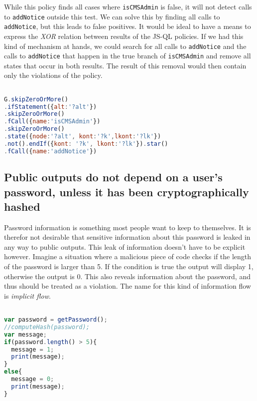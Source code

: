 While this policy finds all cases where \texttt{isCMSAdmin} is false, it will not detect calls to \texttt{addNotice} outside this test. We can solve this by finding all calls to \texttt{addNotice}, but this leads to false positives. It would be ideal to have a means to express the \textit{XOR} relation between results of the JS-QL policies. If we had this kind of mechanism at hands, we could search for all calls to \texttt{addNotice} and the calls to \texttt{addNotice} that happen in the true branch of \texttt{isCMSAdmin} and remove all states that occur in both results. The result of this removal would then contain only the violations of the policy.

\begin{lstlisting}[label={lst:Policy4JSQL},language=JavaScript,caption=Policy 4 in JS-QL]  % float=t?

G.skipZeroOrMore()
.ifStatement({alt:'?alt'})
.skipZeroOrMore()
.fCall({name:'isCMSAdmin'})
.skipZeroOrMore()
.state({node:'?alt', kont:'?k',lkont:'?lk'})
.not().endIf({kont: '?k', lkont:'?lk'}).star()
.fCall({name:'addNotice'})
\end{lstlisting}


\subsection{Public outputs do not depend on a user's password, unless it has been cryptographically hashed}

Password information is something most people want to keep to themselves. It is therefor not desirable that sensitive information about this password is leaked in any way to public outputs. This leak of information doesn't have to be explicit however. Imagine a situation where a malicious piece of code checks if the length of the password is larger than 5. If the condition is true the output will display 1, otherwise the output is 0. This also reveals information about the password, and thus should be treated as a violation. The name for this kind of information flow is \textit{implicit flow}.

\begin{lstlisting}[label={lst:PWDepends},language=JavaScript,caption=The output depends on the password example,mathescape=true]  % float=t?

var password = getPassword();
//computeHash(password);
var message;
if(password.length() > 5){
  message = 1;
  print(message);
}
else{
  message = 0;
  print(message);
}
\end{lstlisting}

